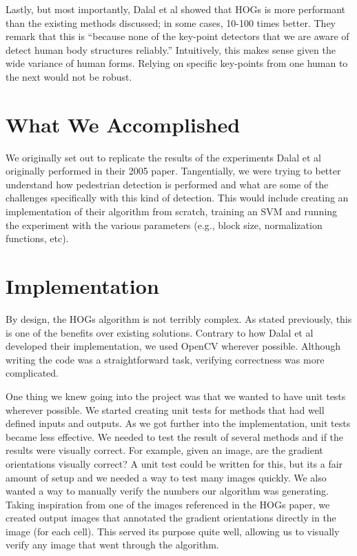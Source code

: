 \documentclass[a4paper,11pt]{article}
\begin{document}
\begin{multicols}{2}
Lastly, but most importantly, Dalal et al showed that HOGs is more performant than the existing methods 
discussed; in some cases, 10-100 times better. They remark that this is ``because none of the key-point 
detectors that we are aware of detect human body structures reliably.'' Intuitively, this makes sense 
given the wide variance of human forms. Relying on specific key-points from one human to the next would not be robust. 

\section{What We Accomplished}
We originally set out to replicate the results of the experiments Dalal et al originally performed in their 
2005 paper. Tangentially, we were trying to better understand how pedestrian detection is performed and what 
are some of the challenges specifically with this kind of detection. This would include creating an 
implementation of their algorithm from scratch, training an SVM and running the experiment with the 
various parameters (e.g., block size, normalization functions, etc).

\section{Implementation}
By design, the HOGs algorithm is not terribly complex. As stated previously, this is one of the benefits 
over existing solutions. Contrary to how Dalal et al developed their implementation, we used 
OpenCV wherever possible. Although writing the code was a straightforward task, verifying correctness 
was more complicated.

One thing we knew going into the project was that we wanted to have unit tests wherever possible. We started 
creating unit tests for methods that had well defined inputs and outputs. As we got further into the 
implementation, unit tests became less effective. We needed to test the result of several methods and 
if the results were visually correct. For example, given an image, are the gradient orientations visually 
correct? A unit test could be written for this, but its a fair amount of setup and we needed a way to test 
many images quickly. We also wanted a way to manually verify the numbers our algorithm was generating. Taking 
inspiration from one of the images referenced in the HOGs paper, we created output images that annotated the 
gradient orientations directly in the image (for each cell). This served its purpose quite well, allowing 
us to visually verify any image that went through the algorithm.


\end{multicols}
\end{document}
